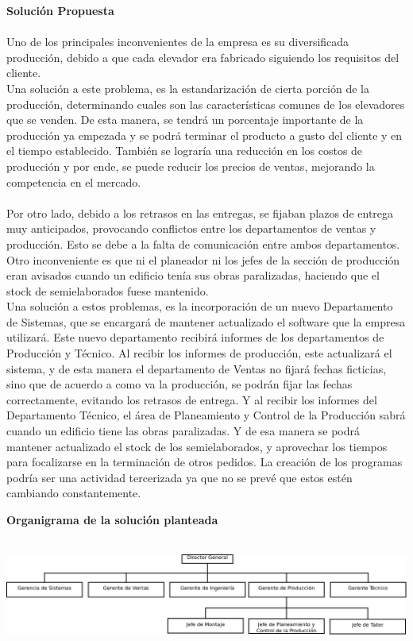 \documentclass[a4paper,10pt,titlepage]{article}
\begin{document}
	\textbf{Soluci\'on Propuesta}\\\\
		\indent Uno de los principales inconvenientes de la empresa es su diversificada producci\'on, debido a que cada elevador era fabricado siguiendo los requisitos del cliente.\\
Una soluci\'on a este problema, es la estandarizaci\'on de cierta porci\'on de la producci\'on, determinando cuales son las caracter\'isticas comunes  de los elevadores que se venden.
De esta manera, se tendr\'a un porcentaje importante de la producci\'on ya empezada y se podr\'a  terminar el producto a gusto del cliente y en el tiempo establecido. Tambi\'en se lograr\'ia una reducci\'on en los costos de producci\'on y por ende, se puede reducir los precios de ventas, mejorando la competencia en el mercado.\\ \\
		\indent Por otro lado, debido a los retrasos en las entregas, se fijaban plazos de entrega muy anticipados, provocando conflictos entre los departamentos de ventas y producci\'on. Esto se debe a la falta de comunicaci\'on entre ambos departamentos. Otro inconveniente es que ni el planeador ni los jefes de la secci\'on de producci\'on eran avisados cuando un edificio ten\'ia sus obras paralizadas, haciendo que el stock de semielaborados fuese mantenido.\\
Una soluci\'on a estos problemas, es la incorporaci\'on de un nuevo Departamento de Sistemas, que se encargar\'a de mantener actualizado el software que la empresa utilizar\'a. Este nuevo departamento recibir\'a informes de los departamentos de Producci\'on y T\'ecnico. Al recibir los informes de producci\'on, este actualizar\'a el sistema, y de esta manera el departamento de Ventas no fijar\'a fechas ficticias, sino que de acuerdo a como va la producci\'on, se podr\'an fijar las fechas correctamente, evitando los retrasos de entrega. Y al recibir los informes del Departamento T\'ecnico, el \'area de Planeamiento y Control de la Producci\'on sabr\'a cuando un edificio tiene las obras paralizadas. Y de esa manera se podr\'a mantener actualizado el stock de los semielaborados, y aprovechar los tiempos para focalizarse en la terminaci\'on de otros pedidos.
La creaci\'on de los programas podr\'ia ser una actividad tercerizada ya que no se prev\'e que estos est\'en cambiando constantemente.


\newpage
	\textbf{Organigrama de la solución planteada}\\\\
    \begin{center}
    \includegraphics[angle=90, scale=0.60]{./Organigramas/hercules2.png}
    \end{center}
\end{document}
